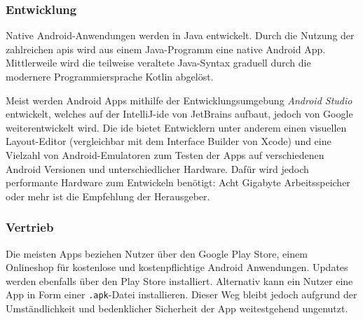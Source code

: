 \subsubsection{Entwicklung}
Native Android-Anwendungen werden in Java entwickelt. Durch die Nutzung der zahlreichen \acp{api} wird aus einem Java-Programm eine native Android App.
\cite[S. 1]{JavaForAndroid}
Mittlerweile wird die teilweise veraltete Java-Syntax graduell durch die modernere Programmiersprache Kotlin abgelöst.
\cite{KotlinAndroid}



Meist werden Android Apps mithilfe der Entwicklungsumgebung \textit{Android Studio} entwickelt, welches auf der IntelliJ-\ac{ide} von JetBrains aufbaut, jedoch von Google weiterentwickelt wird. Die \ac{ide} bietet Entwicklern unter anderem einen visuellen Layout-Editor (vergleichbar mit dem Interface Builder von Xcode) und eine Vielzahl von Android-Emulatoren zum Testen der Apps auf verschiedenen Android Versionen und unterschiedlicher Hardware. Dafür wird jedoch performante Hardware zum Entwickeln benötigt: Acht Gigabyte Arbeitsspeicher oder mehr ist die Empfehlung der Herausgeber. \cite{AndroidStudio}

\subsubsection{Vertrieb}

Die meisten Apps beziehen Nutzer über den Google Play Store, einem Onlineshop für kostenlose und kostenpflichtige Android Anwendungen. 
Updates werden ebenfalls über den Play Store installiert. Alternativ kann ein Nutzer eine App in Form einer \texttt{.apk}-Datei installieren. Dieser Weg bleibt jedoch aufgrund der Umständlichkeit und bedenklicher Sicherheit der App weitestgehend ungenutzt.

